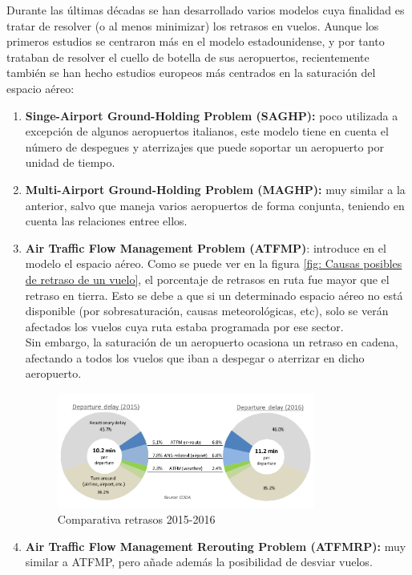 Durante las últimas décadas se han desarrollado varios modelos cuya finalidad es tratar de resolver (o al menos minimizar) los retrasos en vuelos. Aunque los primeros estudios se centraron más en el modelo estadounidense, y por tanto trataban de resolver el cuello de botella de sus aeropuertos, recientemente también se han hecho estudios europeos más centrados en la saturación del espacio aéreo: 
\begin{enumerate}
	\item \textbf{Singe-Airport Ground-Holding Problem (SAGHP):} poco utilizada a excepción de algunos aeropuertos italianos, este modelo tiene en cuenta el número de despegues y aterrizajes que puede soportar un aeropuerto por unidad de tiempo.
	\item \textbf{Multi-Airport Ground-Holding Problem (MAGHP): }muy similar a la anterior, salvo que maneja varios aeropuertos de forma conjunta, teniendo en cuenta las relaciones entree ellos.
	\item \textbf{Air Traffic Flow Management Problem (ATFMP)}: introduce en el modelo el espacio aéreo. Como se puede ver en la figura \ref{fig: Causas posibles de retraso de un vuelo}, el porcentaje de retrasos en ruta fue mayor que el retraso en tierra. Esto se debe a que si un determinado espacio aéreo no está disponible (por sobresaturación, causas meteorológicas, etc), solo se verán afectados los vuelos cuya ruta estaba programada por ese sector.\\
	Sin embargo, la saturación de un aeropuerto ocasiona un retraso en cadena, afectando a todos los vuelos que iban a despegar o aterrizar en dicho aeropuerto.
	\begin{figure}[H]
		\begin{center}
			\centering
			\includegraphics[width=0.8\textwidth]{./imagenes/introduccion/retrasosSalida.png}
			\caption{Comparativa retrasos 2015-2016}
			\label{fig: Comparativa retrasos 2015-2016}
		\end{center}
	\end{figure}
	\item \textbf{Air Traffic Flow Management Rerouting Problem (ATFMRP): }muy similar a ATFMP, pero añade además la posibilidad de desviar vuelos.

\end{enumerate}
